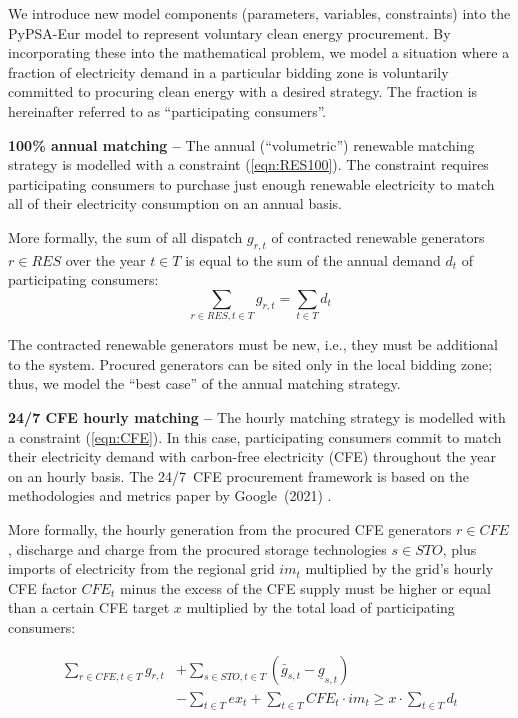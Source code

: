 We introduce new model components (parameters, variables, constraints) into the PyPSA-Eur model to represent voluntary clean energy procurement.
By incorporating these into the mathematical problem, we model a situation where a fraction of electricity demand in a particular bidding zone is voluntarily committed to procuring clean energy with a desired strategy.
The fraction is hereinafter referred to as \enquote{participating consumers}.

\textbf{100\% annual matching --} The annual (\enquote{volumetric}) renewable matching strategy is modelled with a constraint (\ref{eqn:RES100}). 
The constraint requires participating consumers to purchase just enough renewable electricity to match all of their electricity consumption on an annual basis.

More formally, the sum of all dispatch $g_{r,t}$ of contracted renewable generators $r\in RES$ over the year $t\in T$ is equal to the sum of the annual demand $d_t$ of participating consumers:
\begin{equation}
\sum_{r\in RES, t\in T} g_{r,t} = \sum_{t\in T} d_t
\label{eqn:RES100}
\end{equation}

The contracted renewable generators must be new, i.e., they must be additional to the system.
Procured generators can be sited only in the local bidding zone; thus, we model the \enquote{best case} of the annual matching strategy.

\textbf{24/7 CFE hourly matching --} The hourly matching strategy is modelled with a constraint (\ref{eqn:CFE}). In this case, participating consumers commit to match their electricity demand with carbon-free electricity (CFE) throughout the year on an hourly basis. The 24/7~CFE procurement framework is based on the methodologies and metrics paper by Google~(2021) \cite{google-methodologies}.

More formally, the hourly generation from the procured CFE generators $r\in CFE$, discharge and charge from the procured storage technologies $s\in STO$, plus imports of electricity from the regional grid $im_t$ multiplied by the grid's hourly CFE factor $CFE_t$ minus the excess of the CFE supply must be higher or equal than a certain CFE target $x$ multiplied by the total load of participating consumers:

\begin{equation}
    \begin{split}
        \sum_{r\in CFE, t\in T} g_{r,t} &+ \sum_{s\in STO, t\in T} \left(\bar{g}_{s,t} - \underline{g}_{s,t}\right) \\
        &- \sum_{t\in T} ex_t + \sum_{t\in T} CFE_t \cdot im_t \geq x \cdot \sum_{t\in T} d_t
    \end{split}
\label{eqn:CFE}
\end{equation}

